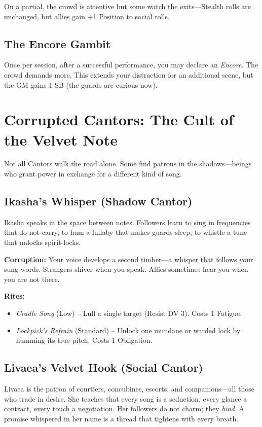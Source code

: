 \documentclass[10pt,twoside]{book}
\begin{document}
On a partial, the crowd is attentive but some watch the exits---Stealth rolls are unchanged, but allies gain +1 Position to social rolls.

\subsection{The Encore Gambit}

Once per session, after a successful performance, you may declare an \textit{Encore}. The crowd demands more. This extends your distraction for an additional scene, but the GM gains 1 SB (the guards are curious now).

\section{Corrupted Cantors: The Cult of the Velvet Note}

Not all Cantors walk the road alone. Some find patrons in the shadows---beings who grant power in exchange for a different kind of song.

\subsection{Ikasha's Whisper (Shadow Cantor)}

Ikasha speaks in the space between notes. Followers learn to sing in frequencies that do not carry, to hum a lullaby that makes guards sleep, to whistle a tune that unlocks spirit-locks.

\textbf{Corruption:} Your voice develops a second timber---a whisper that follows your sung words. Strangers shiver when you speak. Allies sometimes hear you when you are not there.

\textbf{Rites:}
\begin{itemize}
\item \textit{Cradle Song} (Low) -- Lull a single target (Resist DV 3). Costs 1 Fatigue.
\item \textit{Lockpick's Refrain} (Standard) -- Unlock one mundane or warded lock by humming its true pitch. Costs 1 Obligation.
\end{itemize}

\subsection{Livaea's Velvet Hook (Social Cantor)}

Livaea is the patron of courtiers, concubines, escorts, and companions---all those who trade in desire. She teaches that every song is a seduction, every glance a contract, every touch a negotiation. Her followers do not charm; they \emph{bind}. A promise whispered in her name is a thread that tightens with every breath.
\end{document}
